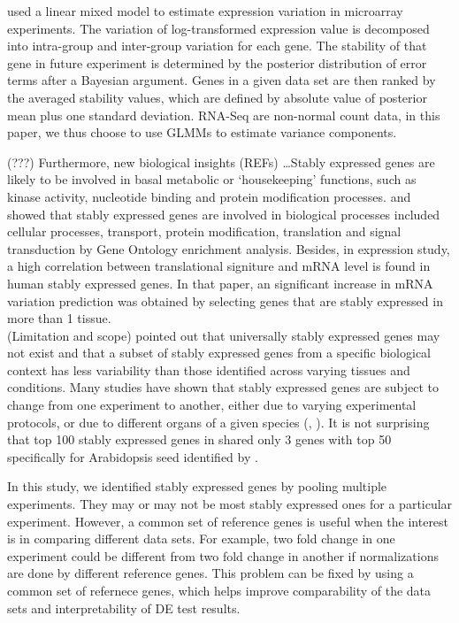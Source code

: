 \documentclass[11pt, a4paper]{article}
\begin{document}
\cite{andersen2004normalization} used a linear mixed model to estimate
expression variation in microarray experiments. The variation of
log-transformed expression value is decomposed into intra-group and
inter-group variation for each gene. The stability of that gene in future
experiment is determined by the posterior distribution of error terms after a
Bayesian argument. Genes in a given data set are then ranked by the averaged
stability values, which are defined by absolute value of posterior mean plus
one standard deviation.  RNA-Seq are non-normal count data, in this paper, we
thus choose to use GLMMs to estimate variance components.

(???) Furthermore, new biological insights (REFs) \dots Stably expressed genes
are likely to be involved in basal metabolic or ‘housekeeping’ functions, such
as  kinase activity, nucleotide binding and protein modification processes.
\cite{sekhon2011genome} and \cite{wang2010dynamic} showed that stably
expressed genes are involved in biological processes included cellular
processes, transport, protein modification, translation and signal
transduction by Gene Ontology enrichment analysis. Besides, in expression
study, a high correlation between translational signiture and mRNA level is
found in human stably expressed genes\citep{line2013translational}. In that
paper, an significant increase in mRNA variation prediction was obtained by
selecting genes that are stably expressed in more than 1 tissue.\\

(Limitation and scope) \cite{hruz2011refgenes} pointed out that universally
stably expressed genes may not exist and that a subset of stably expressed
genes from a specific biological context has less variability than those
identified across varying tissues and conditions. Many studies have shown that
stably expressed genes are subject to change from one experiment to another,
either due to varying experimental protocols, or due to different organs of a given
species (\cite{reid2006optimized}, \cite{hong2010identification}).  It is not
surprising that top 100 stably expressed genes in \cite{czechowski2005genome} shared only 3 genes with top 50  specifically for Arabidopsis seed identified by \cite{dekkers2012identification}.

In this study, we identified stably expressed genes by pooling multiple experiments. They may or may not be most stably expressed ones for a particular experiment. However, a common set of reference genes is useful when the interest is in comparing different data sets. For example, two fold change in one experiment could be different from two fold change in another if normalizations are done by different reference genes. This problem can be fixed by using a common set of refernece genes, which helps improve comparability of the data sets and interpretability of DE test results.  
\end{document}
